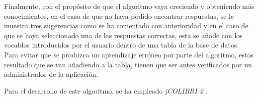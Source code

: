 Finalmente, con el propósito de que el algoritmo vaya creciendo y obteniendo más conocimientos, en el caso de que no haya podido encontrar respuestas, se le muestra tres sugerencias como se ha comentado con anterioridad y en el caso de que se haya seleccionado una de las respuestas correctas, esta se añade con los vocablos introducidos por el usuario dentro de una tabla de la base de datos. Para evitar que se produzca un aprendizaje erróneo por parte del algoritmo, estos resultado que se van añadiendo a la tabla, tienen que ser antes verificados por un administrador de la aplicación.

Para el desarrollo de este algoritmo, se ha empleado \textit{jCOLIBRI 2} \cite{jcolibri:info}.

